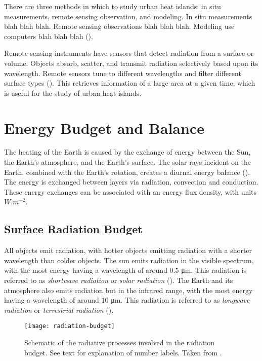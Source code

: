 	There are three methods in which to study urban heat islands:
	in situ measurements,
	remote sensing observation,
	and modeling.
	In situ measurements blah blah blah.
	Remote sensing observations blah blah blah.
	Modeling use computers blah blah blah (\cite{Bahi2020}).
	
	Remote-sensing instruments have sensors that detect radiation from a surface or volume.
	Objects absorb, scatter, and transmit radiation selectively based upon its wavelength.
	Remote sensors tune to different wavelengths and filter different surface types (\cite{Oke2017urban}).
	This retrieves information of a large area at a given time, which is useful for the study of urban heat islands.

\section{Energy Budget and Balance}

	The heating of the Earth is caused by the exchange of energy between the Sun, the Earth's atmosphere, and the Earth's surface.
	The solar rays incident on the Earth, combined with the Earth's rotation, creates a diurnal energy balance (\cite{Wallace2006}).
	The energy is exchanged between layers via radiation, convection and
	conduction.
	These energy exchanges can be associated with an energy flux density, with units $\si{W.m^{-2}}$.
	
	\subsection{Surface Radiation Budget}
		All objects emit radiation, with hotter objects emitting radiation with a shorter wavelength than colder objects.
		The sun emits radiation in the visible spectrum, with the most energy having a wavelength of around $0.5$ \si{\micro m}.
		This radiation is referred to as \textit{shortwave radiation} or \textit{solar radiation} (\cite{Oke2017urban}).
		The Earth and its atmosphere also emits radiation but in the infrared range, with the most energy having a wavelength of around $10$ \si{\micro m}.
		This radiation is referred to as \textit{longwave radiation} or \textit{terrestrial radiation} (\cite{Oke2017urban}).
		
		\begin{figure}	
			\centering
			\texttt{[image: radiation-budget]}
			\caption{Schematic of the radiative processes involved in the radiation budget. See text for explanation of number labels. Taken from \textcite{Oke1982}.}
			\label{fig:radiation-budget}
		\end{figure}
	
